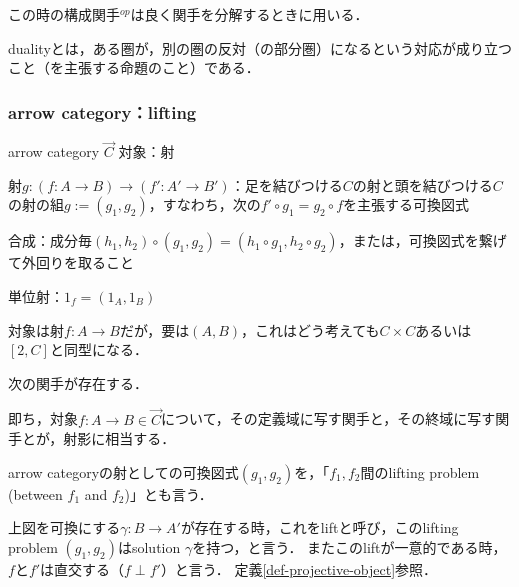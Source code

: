 \documentclass[uplatex, dvipdfmx]{jsarticle}
\begin{document}
この時の構成関手${}^{op}$は良く関手を分解するときに用いる．

dualityとは，ある圏が，別の圏の反対（の部分圏）になるという対応が成り立つこと（を主張する命題のこと）である．

\subsubsection{arrow category：lifting}

\begin{itembox}[l]{arrow category $\overrightarrow{C}$}
    対象：射

    射$g:(f:A\to B)\to (f':A'\to B')$：足を結びつける$C$の射と頭を結びつける$C$の射の組$g:=(g_1,g_2)$，すなわち，次の$f'\circ g_1=g_2\circ f$を主張する可換図式
    \begin{center}\end{center}
    合成：成分毎$(h_1,h_2)\circ (g_1,g_2)=(h_1\circ g_1, h_2\circ g_2)$，または，可換図式を繋げて外回りを取ること
    
    単位射：$1_f=(1_A,1_B)$
\end{itembox}

対象は射$f:A\to B$だが，要は$(A,B)$，これはどう考えても$C\times C$あるいは$[2,C]$と同型になる．
\begin{proposition*}
    次の関手が存在する．
\begin{center}\end{center}
    即ち，対象$f:A\to B\in\overrightarrow{C}$について，その定義域に写す関手と，その終域に写す関手とが，射影に相当する．
\end{proposition*}

\begin{remark*}
    arrow categoryの射としての可換図式$(g_1,g_2)$を，「$f_1,f_2$間のlifting problem (between $f_1$ and $f_2$)」とも言う．
    \begin{center}\end{center}
    上図を可換にする$\gamma:B\to A'$が存在する時，これをliftと呼び，このlifting problem $(g_1,g_2)$はsolution $\gamma$を持つ，と言う．
    またこのliftが一意的である時，$f$と$f'$は直交する（$f\perp f'$）と言う．
    定義\ref{def-projective-object}参照．
\end{remark*}
\end{document}
